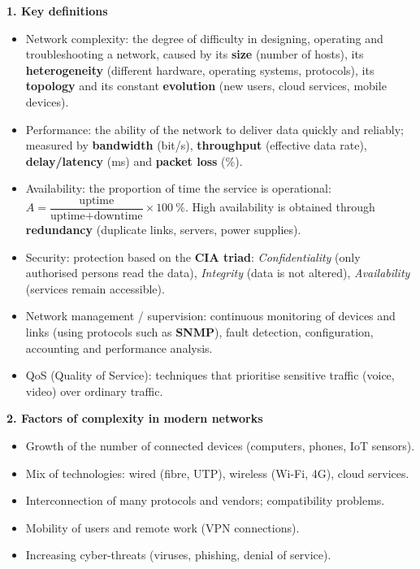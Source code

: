 \documentclass[11pt]{article}
\newcommand{\cle}[1]{{\popxbold\color{popdark}#1}}
\begin{document}
\begin{bilan}
\textbf{1. Key definitions}\par
\begin{itemize}
\item \cle{Network complexity}: the degree of difficulty in designing, operating and troubleshooting a network, caused by its \textbf{size} (number of hosts), its \textbf{heterogeneity} (different hardware, operating systems, protocols), its \textbf{topology} and its constant \textbf{evolution} (new users, cloud services, mobile devices).
\item \cle{Performance}: the ability of the network to deliver data quickly and reliably; measured by \textbf{bandwidth} (bit/s), \textbf{throughput} (effective data rate), \textbf{delay/latency} (ms) and \textbf{packet loss} (\%).
\item \cle{Availability}: the proportion of time the service is operational: $A = \dfrac{\text{uptime}}{\text{uptime}+\text{downtime}} \times 100\ \%$. High availability is obtained through \textbf{redundancy} (duplicate links, servers, power supplies).
\item \cle{Security}: protection based on the \textbf{CIA triad}: \emph{Confidentiality} (only authorised persons read the data), \emph{Integrity} (data is not altered), \emph{Availability} (services remain accessible).
\item \cle{Network management / supervision}: continuous monitoring of devices and links (using protocols such as \textbf{SNMP}), fault detection, configuration, accounting and performance analysis.
\item \cle{QoS} (Quality of Service): techniques that prioritise sensitive traffic (voice, video) over ordinary traffic.
\end{itemize}

\textbf{2. Factors of complexity in modern networks}\par
\begin{itemize}
\item Growth of the number of connected devices (computers, phones, IoT sensors).
\item Mix of technologies: wired (fibre, UTP), wireless (Wi-Fi, 4G), cloud services.
\item Interconnection of many protocols and vendors; compatibility problems.
\item Mobility of users and remote work (VPN connections).
\item Increasing cyber-threats (viruses, phishing, denial of service).
\end{itemize}


\end{bilan}
\end{document}

